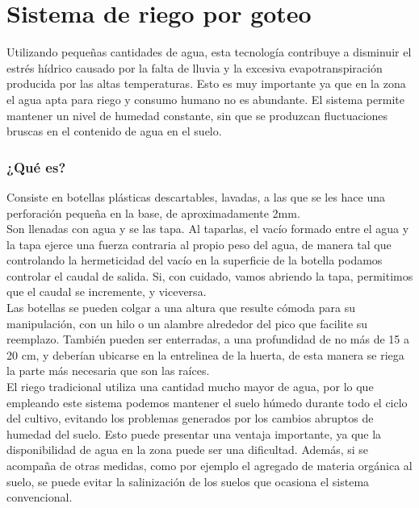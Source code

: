 \documentclass[../main.tex]{subfiles}
\begin{document}
\restoregeometry
\flushleft


\section{Sistema de riego por goteo}\label{appendixB}

Utilizando pequeñas cantidades de agua, esta tecnología contribuye a disminuir el estrés hídrico causado por la falta de lluvia y la excesiva evapotranspiración producida por las altas temperaturas. 
Esto es muy importante ya que en la zona el agua apta para riego y consumo humano no es abundante. El sistema permite mantener un nivel de humedad constante, sin que se produzcan fluctuaciones bruscas en el contenido de agua en el suelo. \\

\subsubsection{¿Qué es?}

Consiste en botellas plásticas descartables, lavadas, a las que se les hace una perforación pequeña en la base, de aproximadamente 2mm. \\
Son llenadas con agua y se las tapa. Al taparlas, el vacío formado entre el agua y la tapa ejerce una fuerza contraria al propio peso del agua, de manera tal que controlando la hermeticidad del vacío en la superficie de la botella podamos controlar el caudal de salida. Si, con cuidado, vamos abriendo la tapa, permitimos que el caudal se incremente, y viceversa.\\
Las botellas se pueden colgar a una altura que resulte cómoda para su manipulación, con un hilo o un alambre alrededor del pico que facilite su reemplazo. También pueden ser enterradas, a una profundidad de no más de 15 a 20 cm, y deberían ubicarse en la entrelinea de la huerta, de esta manera se riega la parte más necesaria que son las raíces.  \\

El riego tradicional utiliza una cantidad mucho mayor de agua, por lo que empleando este sistema podemos mantener el suelo húmedo durante todo el ciclo del cultivo, evitando los problemas generados por los cambios abruptos de humedad del suelo. Esto puede presentar una ventaja importante, ya que la disponibilidad de agua en la zona puede ser una dificultad. Además, si se acompaña de otras medidas, como por ejemplo el agregado de materia orgánica al suelo, se puede evitar la salinización de los suelos que ocasiona el sistema convencional. \\
\end{document}
